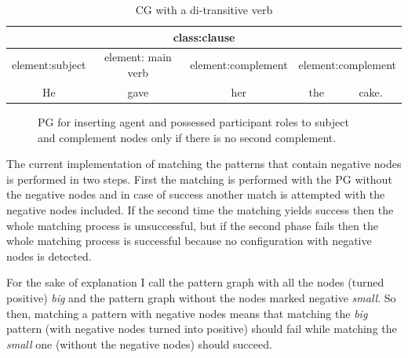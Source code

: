     \begin{table}[!ht]
    \centering
    \begin{tabular}{|c|c|c|c|c|}
    \hline
    \multicolumn{5}{|c|}{class:clause}                                                                  \\ \hline
    element:subject & element: main verb & element:complement & \multicolumn{2}{c|}{element:complement} \\ \hline
    He              & gave               & her                & the               & cake.               \\ \hline
    \end{tabular}
    \caption{CG with a di-transitive verb}
    \label{tab:di-transitive1}
    \end{table}
    
    \begin{figure}[hbtp]
    \centering
    \caption{PG for inserting agent and possessed participant roles to subject and complement nodes only if there is no second complement.}
    \label{fig:gp4}
    \end{figure}

    The current implementation of matching the patterns that contain negative nodes is performed in two steps. First the matching is performed with the PG without the negative nodes and in case of success another match is attempted with the negative nodes included. If the second time the matching yields success then the whole matching process is unsuccessful, but if the second phase fails then the whole matching process is successful because no configuration with negative nodes is detected.

    For the sake of explanation I call the pattern graph with all the nodes (turned positive) \textit{big} and the pattern graph without the nodes marked negative \textit{small}. So then, matching a pattern with negative nodes means that matching the \textit{big} pattern (with negative nodes turned into positive) should fail while matching the \textit{small} one (without the negative nodes) should succeed.

